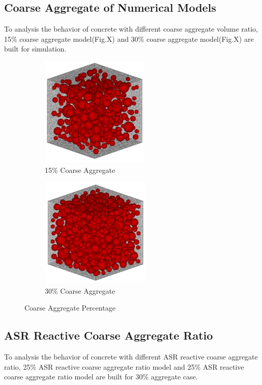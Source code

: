 \subsection{Coarse Aggregate of Numerical Models}

To analysis the behavior of concrete with different coarse aggregate volume ratio, 15\% coarse aggregate model(Fig.X) and 30\% coarse aggregate model(Fig.X) are built for simulation.

\begin{figure}[ht!]
\centering
\begin{subfigure}{.5\textwidth}
  \centering
  \includegraphics[width=.4\linewidth]{Files/Aggregate/A15.png}
  \caption{15\% Coarse Aggregate}
  \label{fig:A15_model}
\end{subfigure}%
\begin{subfigure}{.5\textwidth}
  \centering
  \includegraphics[width=.4\linewidth]{Files/Aggregate/A30.png}
  \caption{30\% Coarse Aggregate}
  \label{fig:A30_model}
\end{subfigure}
\caption{Coarse Aggregate Percentage}
\label{fig:Aggregate_Percentage}
\end{figure}

\subsection{ASR Reactive Coarse Aggregate Ratio}

To analysis the behavior of concrete with different ASR reactive coarse aggregate ratio, 25\% ASR reactive coarse aggregate ratio model and 25\% ASR reactive coarse aggregate ratio model are built for 30\% aggregate case.

